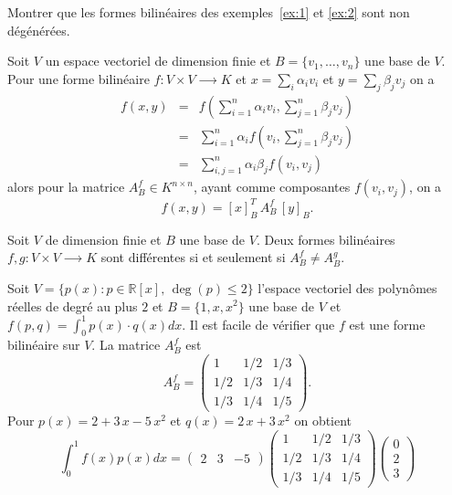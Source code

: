 \begin{exercise}
  \label{ex:3}
  Montrer que les  formes bilinéaires  des exemples~\ref{ex:1} et \ref{ex:2} sont non dégénérées. 
\end{exercise}



Soit $V$ un espace vectoriel de dimension finie et $B = \{v_1,\dots,v_n\}$ une base de $V$. Pour une forme bilinéaire $f: V × V ⟶ K$ 
 et $x = \sum_i\alpha_i v_i$ et $y = \sum_j \beta_j v_j$ on a 
 \begin{eqnarray*}
   f(x,y) & = & f \left( ∑_{i=1}^n \alpha_i v_i ,   ∑_{j=1}^n \beta_j v_j \right) \\
          & = & ∑_{i=1}^n \alpha_i f \left(  v_i ,   ∑_{j=1}^n \beta_j v_j \right) \\
          & = & ∑_{i,j=1}^n \alpha_i β_j f (  v_i ,  v_j )
    \end{eqnarray*}
alors pour la matrice $A_B^f \in K^{n\times n}$, ayant comme composantes $f(v_i,v_j)$, on a 
\begin{displaymath}
  f(x,y) = [x]_B^T \,A_B^f \,  [y]_B. 
\end{displaymath}
\begin{exercise} Soit $V$ de dimension finie et $B$ une base de $V$. 
  Deux formes bilinéaires $f,g : V × V ⟶ K$
  sont différentes si et seulement si $A_B^f \neq A_B^g$. 
\end{exercise}


\begin{example}
  \label{exe:9}
  Soit $V = \{ p(x) : p ∈ ℝ[x], \, \deg(p)≤ 2\}$ l'espace vectoriel des polynômes réelles de degré au plus $2$ et $B = \{ 1,x,x^2\}$ une base de $V$ et $f(p,q) = \int_0^1 p(x) ⋅ q(x) dx$. Il est facile de vérifier que $f$ est une forme bilinéaire sur $V$. La matrice $A_B^f$ est 
  \begin{displaymath}
    A_B^f =
    \begin{pmatrix}
      1 & 1/2 & 1/3 \\
      1/2 & 1/3 & 1/4\\
      1/3 & 1/4 & 1/5
    \end{pmatrix}. 
  \end{displaymath}
 Pour $p(x) = 2+3\,x - 5\,x^2$ et $q(x) = 2\,x + 3\,x^2$ on obtient 
 \begin{displaymath}
   \int_0^1 f(x) p(x) dx =
   \begin{pmatrix}
     2 & 3 & -5
   \end{pmatrix}
 \begin{pmatrix}
      1 & 1/2 & 1/3 \\
      1/2 & 1/3 & 1/4\\
      1/3 & 1/4 & 1/5
    \end{pmatrix}
   \begin{pmatrix}
     0\\2\\3
   \end{pmatrix}
 \end{displaymath}
\end{example}


